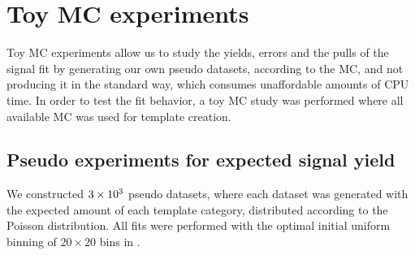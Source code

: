 \section{Toy MC experiments}

Toy MC experiments allow us to study the yields, errors and the pulls of the signal fit by generating our own pseudo datasets, according to the MC, and not producing it in the standard way, which consumes unaffordable amounts of CPU time. In order to test the fit behavior, a toy MC study was performed where all available MC was used for template creation. 

\subsection{Pseudo experiments for expected signal yield}

We constructed $3\times 10^{3}$ pseudo datasets, where each dataset was generated with the expected amount of each template category, distributed according to the Poisson distribution. All fits were performed with the optimal initial uniform binning of $20\times20$ bins in \vars.


